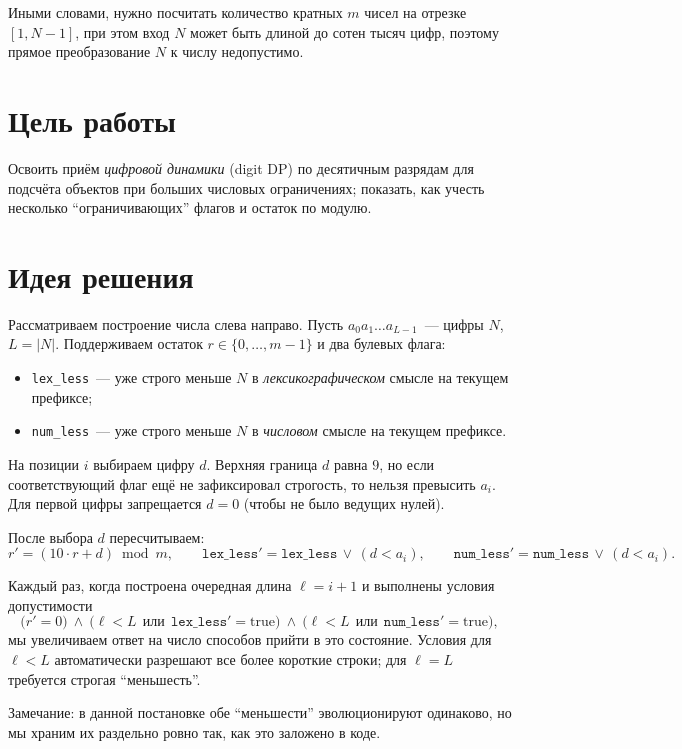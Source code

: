 \documentclass[12pt,a4paper]{article}
\begin{document}
Иными словами, нужно посчитать количество кратных $m$ чисел на отрезке $[1, N-1]$,
при этом вход $N$ может быть длиной до сотен тысяч цифр, поэтому прямое преобразование $N$ к числу недопустимо.

\section*{Цель работы}

Освоить приём \emph{цифровой динамики} (digit DP) по десятичным разрядам для подсчёта объектов при больших числовых ограничениях; показать, как учесть несколько ``ограничивающих'' флагов и остаток по модулю.

\section*{Идея решения}

Рассматриваем построение числа слева направо. Пусть $a_0 a_1 \dots a_{L-1}$~--- цифры $N$, $L = |N|$.
Поддерживаем остаток $r \in \{0,\dots,m-1\}$ и два булевых флага:

\begin{itemize}
  \item \texttt{lex\_less}~--- уже строго меньше $N$ в \emph{лексикографическом} смысле на текущем префиксе;
  \item \texttt{num\_less}~--- уже строго меньше $N$ в \emph{числовом} смысле на текущем префиксе.
\end{itemize}

На позиции $i$ выбираем цифру $d$. Верхняя граница $d$ равна $9$, но если соответствующий флаг ещё не зафиксировал строгость, то нельзя превысить $a_i$.
Для первой цифры запрещается $d=0$ (чтобы не было ведущих нулей).

После выбора $d$ пересчитываем:
\[
r' = (10\cdot r + d)\bmod m,\qquad
\texttt{lex\_less}' = \texttt{lex\_less} \,\lor\, (d < a_i),\qquad
\texttt{num\_less}' = \texttt{num\_less} \,\lor\, (d < a_i).
\]

Каждый раз, когда построена очередная длина $\ell=i+1$ и выполнены условия допустимости
\[
\bigl(r' = 0\bigr)\ \wedge\
\bigl( \ell < L \ \ \text{или}\ \ \texttt{lex\_less}' = \text{true} \bigr)\ \wedge\
\bigl( \ell < L \ \ \text{или}\ \ \texttt{num\_less}' = \text{true} \bigr),
\]
мы увеличиваем ответ на число способов прийти в это состояние.
Условия для $\ell < L$ автоматически разрешают все более короткие строки; для $\ell=L$ требуется строгая ``меньшесть''.

Замечание: в данной постановке обе ``меньшести'' эволюционируют одинаково, но мы храним их раздельно ровно так, как это заложено в коде.
\end{document}
